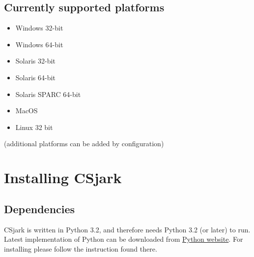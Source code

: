 \documentclass[A4paper,10pt,english]{sphinxmanual}
\begin{document}
\subsection{Currently supported platforms}
\label{user/features:currently-supported-platforms}\begin{itemize}
\item {} 
Windows 32-bit

\item {} 
Windows 64-bit

\item {} 
Solaris 32-bit

\item {} 
Solaris 64-bit

\item {} 
Solaris SPARC 64-bit

\item {} 
MacOS

\item {} 
Linux 32 bit

\end{itemize}

(additional platforms can be added by configuration)


\section{Installing CSjark}
\label{user/install::doc}\label{user/install:installing-csjark}

\subsection{Dependencies}
\label{user/install:dependencies}
CSjark is written in Python 3.2, and therefore needs Python 3.2 (or later) to run. Latest implementation of Python can be downloaded from \href{http://www.python.org/}{Python website}. For installing please follow the instruction found there.
\end{document}
